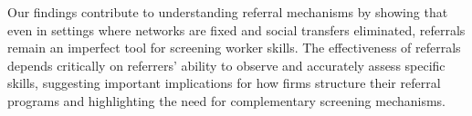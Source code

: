 \documentclass[11pt,a4paper,oneside]{article}
\begin{document}
  Our findings contribute to understanding referral mechanisms by showing that even in settings where networks are fixed and social transfers eliminated, referrals remain an imperfect tool for screening worker skills. The effectiveness of referrals depends critically on referrers' ability to observe and accurately assess specific skills, suggesting important implications for how firms structure their referral programs and highlighting the need for complementary screening mechanisms.

\end{document}
